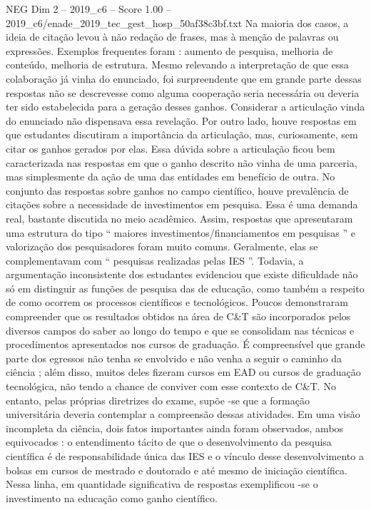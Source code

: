 \begin{textsample}{NEG Dim 2 – 2019\_c6 – Score 1.00 – 2019\_c6/enade\_2019\_tec\_gest\_hosp\_50af38c3bf.txt}
Na maioria dos casos, a ideia de citação levou à não redação de frases, mas à menção de palavras ou expressões.
Exemplos frequentes foram : aumento de pesquisa, melhoria de conteúdo, melhoria de estrutura.
Mesmo relevando a interpretação de que essa colaboração já vinha do enunciado, foi surpreendente que em grande parte dessas respostas não se descrevesse como alguma cooperação seria necessária ou deveria ter sido estabelecida para a geração desses ganhos.
Considerar a articulação vinda do enunciado não dispensava essa revelação.
Por outro lado, houve respostas em que estudantes discutiram a importância da articulação, mas, curiosamente, sem citar os ganhos gerados por elas.
Essa dúvida sobre a articulação ficou bem caracterizada nas respostas em que o ganho descrito não vinha de uma parceria, mas simplesmente da ação de uma das entidades em benefício de outra.
No conjunto das respostas sobre ganhos no campo científico, houve prevalência de citações sobre a necessidade de investimentos em pesquisa.
Essa é uma demanda real, bastante discutida no meio acadêmico.
Assim, respostas que apresentaram uma estrutura do tipo “ maiores investimentos/financiamentos em pesquisas ” e valorização dos pesquisadores foram muito comuns.
Geralmente, elas se complementavam com “ pesquisas realizadas pelas IES ”.
Todavia, a argumentação inconsistente dos estudantes evidenciou que existe dificuldade não só em distinguir as funções de pesquisa das de educação, como também a respeito de como ocorrem os processos científicos e tecnológicos.
Poucos demonstraram compreender que os resultados obtidos na área de C\&T são incorporados pelos diversos campos do saber ao longo do tempo e que se consolidam nas técnicas e procedimentos apresentados nos cursos de graduação.
É compreensível que grande parte dos egressos não tenha se envolvido e não venha a seguir o caminho da ciência ; além disso, muitos deles fizeram cursos em EAD ou cursos de graduação tecnológica, não tendo a chance de conviver com esse contexto de C\&T.
No entanto, pelas próprias diretrizes do exame, supõe -se que a formação universitária deveria contemplar a compreensão dessas atividades.
Em uma visão incompleta da ciência, dois fatos importantes ainda foram observados, ambos equivocados : o entendimento tácito de que o desenvolvimento da pesquisa científica é de responsabilidade única das IES e o vínculo desse desenvolvimento a bolsas em cursos de mestrado e doutorado e até mesmo de iniciação científica.
Nessa linha, em quantidade significativa de respostas exemplificou -se o investimento na educação como ganho científico.

\end{textsample}
